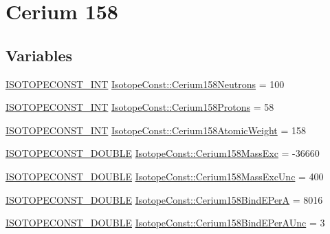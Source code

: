 \hypertarget{group___isotope_const-_cerium-_ce158}{}\section{Cerium 158}
\label{group___isotope_const-_cerium-_ce158}
\subsection*{Variables}
\begin{DoxyCompactItemize}
\item 
\mbox{\hyperlink{group___isotope_const-_macros_ga5f18360b3e99483a35c32d789e62621c}{I\+S\+O\+T\+O\+P\+E\+C\+O\+N\+S\+T\+\_\+\+I\+NT}} \mbox{\hyperlink{group___isotope_const-_cerium-_ce158_ga3d5afd7b1ce190617f2fa071e402c6e6}{Isotope\+Const\+::\+Cerium158\+Neutrons}} = 100
\item 
\mbox{\hyperlink{group___isotope_const-_macros_ga5f18360b3e99483a35c32d789e62621c}{I\+S\+O\+T\+O\+P\+E\+C\+O\+N\+S\+T\+\_\+\+I\+NT}} \mbox{\hyperlink{group___isotope_const-_cerium-_ce158_ga80001586b8a8db8b035a3e100681de75}{Isotope\+Const\+::\+Cerium158\+Protons}} = 58
\item 
\mbox{\hyperlink{group___isotope_const-_macros_ga5f18360b3e99483a35c32d789e62621c}{I\+S\+O\+T\+O\+P\+E\+C\+O\+N\+S\+T\+\_\+\+I\+NT}} \mbox{\hyperlink{group___isotope_const-_cerium-_ce158_ga92c17a81faf4a018af1114599404a49d}{Isotope\+Const\+::\+Cerium158\+Atomic\+Weight}} = 158
\item 
\mbox{\hyperlink{group___isotope_const-_macros_ga8f45a7272ce02c0b4c65c44636ed719a}{I\+S\+O\+T\+O\+P\+E\+C\+O\+N\+S\+T\+\_\+\+D\+O\+U\+B\+LE}} \mbox{\hyperlink{group___isotope_const-_cerium-_ce158_gabe7e50fb380285e4961268c44c3e0e0c}{Isotope\+Const\+::\+Cerium158\+Mass\+Exc}} = -\/36660
\item 
\mbox{\hyperlink{group___isotope_const-_macros_ga8f45a7272ce02c0b4c65c44636ed719a}{I\+S\+O\+T\+O\+P\+E\+C\+O\+N\+S\+T\+\_\+\+D\+O\+U\+B\+LE}} \mbox{\hyperlink{group___isotope_const-_cerium-_ce158_ga927a7997050a3e092d3efe02969faabc}{Isotope\+Const\+::\+Cerium158\+Mass\+Exc\+Unc}} = 400
\item 
\mbox{\hyperlink{group___isotope_const-_macros_ga8f45a7272ce02c0b4c65c44636ed719a}{I\+S\+O\+T\+O\+P\+E\+C\+O\+N\+S\+T\+\_\+\+D\+O\+U\+B\+LE}} \mbox{\hyperlink{group___isotope_const-_cerium-_ce158_gab937f9e5fc2988421057403f5a7a65e9}{Isotope\+Const\+::\+Cerium158\+Bind\+E\+PerA}} = 8016
\item 
\mbox{\hyperlink{group___isotope_const-_macros_ga8f45a7272ce02c0b4c65c44636ed719a}{I\+S\+O\+T\+O\+P\+E\+C\+O\+N\+S\+T\+\_\+\+D\+O\+U\+B\+LE}} \mbox{\hyperlink{group___isotope_const-_cerium-_ce158_gafaa8f09004209489a8cd3e8016735078}{Isotope\+Const\+::\+Cerium158\+Bind\+E\+Per\+A\+Unc}} = 3

\end{DoxyCompactItemize}
